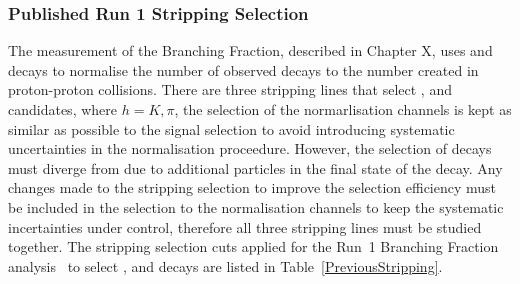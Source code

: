  



\subsubsection{Published Run 1 Stripping Selection}
\label{strippingold}
The measurement of the \bsmumu Branching Fraction, described in Chapter X, uses \bujpsik and \bdkpi decays to normalise the number of observed \bsmumu decays to the number created in proton-proton collisions. There are three stripping lines that select \bmumu, \bujpsik and \bhh candidates, where $h = K, \pi$, the selection of the normarlisation channels is kept as similar as possible to the signal selection to avoid introducing systematic uncertainties in the normalisation proceedure. However, the selection of \bujpsik decays must diverge from \bsmumu due to additional particles in the final state of the decay. Any changes made to the \bmumu stripping selection to improve the selection efficiency must be included in the selection to the normalisation channels to keep the systematic incertainties under control, therefore all three stripping lines must be studied together. The stripping selection cuts applied for the Run~1 Branching Fraction analysis~\cite{} to select \bmumu, \bhh and \bujpsik decays are listed in Table~\ref{PreviousStripping}.

